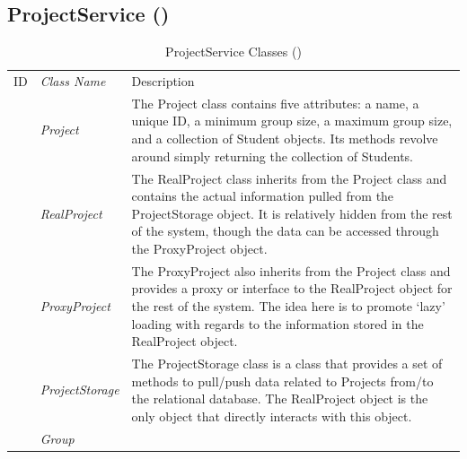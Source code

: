 \documentclass[12pt,letterpaper]{article}
\begin{document}
\subsection{ProjectService ()}
\begin{table}[H]
	\caption{ProjectService Classes ()} 
	\begin{tabu} to 
	    \tableheader{}ID & Class Name & Description \\
		 & Project & The Project class contains five attributes: a name, a unique ID, a minimum group size, a maximum group size, and a collection of Student objects. Its methods revolve around simply returning the collection of Students.\\
		 & RealProject & The RealProject class inherits from the Project class and contains the actual information pulled from the ProjectStorage object. It is relatively hidden from the rest of the system, though the data can be accessed through the ProxyProject object.\\
		 & ProxyProject & The ProxyProject also inherits from the Project class and provides a proxy or interface to the RealProject object for the rest of the system. The idea here is to promote `lazy' loading with regards to the information stored in the RealProject object.\\
		 & ProjectStorage & The ProjectStorage class is a class that provides a set of methods to pull/push data related to Projects from/to the relational database. The RealProject object is the only object that directly interacts with this object.\\
		 & Group & \\
	\end{tabu}
\end{table}
\end{document}
